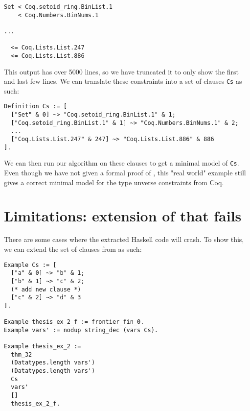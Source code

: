 \begin{minipage}{\linewidth}
\begin{lstlisting}[language=Coq, label={lst:universe_hierarchy}, caption={Universe hierarchy in \lstinline{Main.v}}]
Set < Coq.setoid_ring.BinList.1
    < Coq.Numbers.BinNums.1

...

  <= Coq.Lists.List.247
  <= Coq.Lists.List.886
\end{lstlisting}
\end{minipage}

This output has over 5000 lines, so we have truncated it to only show the first and last few lines.
We can translate these constraints into a set of clauses \lstinline{Cs} as such:

\begin{minipage}{\linewidth}
\begin{lstlisting}[language=Coq, label={lst:universe_hierarchy_clauses}, caption={Universe hierarchy as clauses}]
Definition Cs := [
  ["Set" & 0] ~> "Coq.setoid_ring.BinList.1" & 1;
  ["Coq.setoid_ring.BinList.1" & 1] ~> "Coq.Numbers.BinNums.1" & 2;
  ...
  ["Coq.Lists.List.247" & 247] ~> "Coq.Lists.List.886" & 886
].
\end{lstlisting}
\end{minipage}

We can then run our algorithm on these clauses to get a minimal model of \lstinline{Cs}.
Even though we have not given a formal proof of ,
this "real world" example still gives a correct minimal model for the type unverse constraints from Coq.

\section{Limitations: extension of  that fails}
\label{sec:limitations}

There are some cases where the extracted Haskell code will crash.
To show this, we can extend the set of clauses from  as such:

\begin{minipage}{\linewidth}
\begin{lstlisting}[language=Coq, label={lst:thm_32_coq_example_extended}, caption={\lstinline{thm_32} example extended}]
Example Cs := [
  ["a" & 0] ~> "b" & 1;
  ["b" & 1] ~> "c" & 2;
  (* add new clause *)
  ["c" & 2] ~> "d" & 3
].

Example thesis_ex_2_f := frontier_fin_0.
Example vars' := nodup string_dec (vars Cs).

Example thesis_ex_2 :=
  thm_32
  (Datatypes.length vars')
  (Datatypes.length vars')
  Cs
  vars'
  []
  thesis_ex_2_f.
\end{lstlisting}
\end{minipage}

